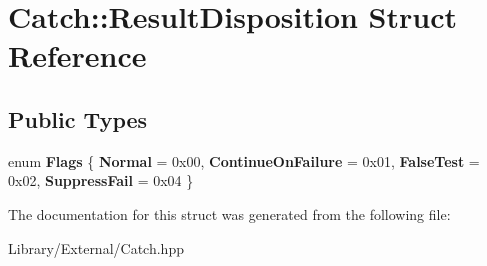 \hypertarget{struct_catch_1_1_result_disposition}{}\section{Catch\+:\+:Result\+Disposition Struct Reference}
\label{struct_catch_1_1_result_disposition}
\subsection*{Public Types}
\begin{DoxyCompactItemize}
\item 
\hypertarget{struct_catch_1_1_result_disposition_a3396cad6e2259af326b3aae93e23e9d8}{}enum {\bfseries Flags} \{ {\bfseries Normal} = 0x00, 
{\bfseries Continue\+On\+Failure} = 0x01, 
{\bfseries False\+Test} = 0x02, 
{\bfseries Suppress\+Fail} = 0x04
 \}\label{struct_catch_1_1_result_disposition_a3396cad6e2259af326b3aae93e23e9d8}

\end{DoxyCompactItemize}


The documentation for this struct was generated from the following file\+:\begin{DoxyCompactItemize}
\item 
Library/\+External/Catch.\+hpp\end{DoxyCompactItemize}

